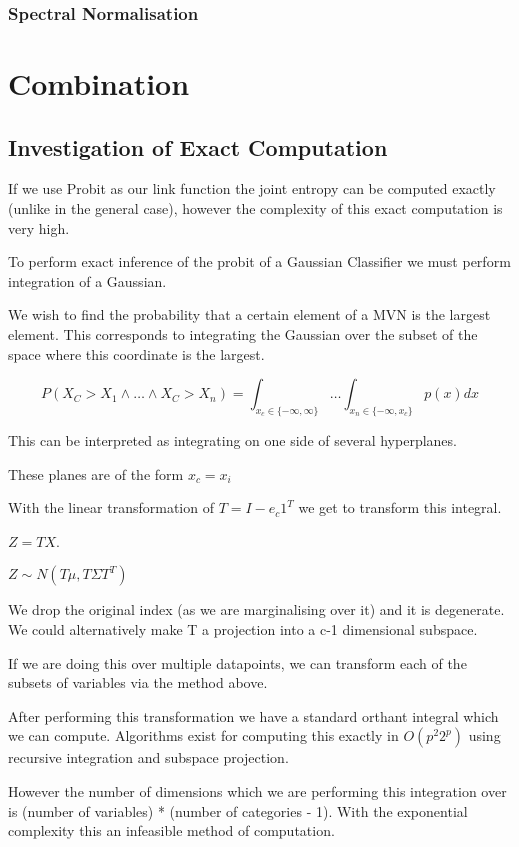 \documentclass[12pt, a4paper]{report}
\theoremstyle{definition}
\begin{document}
\subsection{Spectral Normalisation}

\chapter{Combination}
\label{Chap5}

\section{Investigation of Exact Computation}

If we use Probit as our link function the joint entropy can be computed exactly (unlike in the general case), however the complexity of this exact computation is very high.

To perform exact inference of the probit of a Gaussian Classifier we must perform integration of a Gaussian.

We wish to find the probability that a certain element of a MVN is the largest element. This corresponds to integrating the Gaussian over the subset of the space where this coordinate is the largest.

$$P(X_C > X_1 \land \ldots \land X_C > X_n) = \int_{x_c \in \{ -\infty, \infty \} } \ldots \int_{x_n \in \{ -\infty , x_c \}} p(x) dx$$

This can be interpreted as integrating on one side of several hyperplanes.

These planes are of the form $x_c = x_i$

With the linear transformation of $T = I - e_c 1^T$ we get to transform this integral.

$Z = TX$.

$Z \sim N(T \mu, T \Sigma T^T)$

We drop the original index (as we are marginalising over it) and it is degenerate. We could alternatively make T a projection into a c-1 dimensional subspace.

If we are doing this over multiple datapoints, we can transform each of the subsets of variables via the method above.

After performing this transformation we have a standard orthant integral which we can compute. Algorithms exist for computing this exactly in $O(p^2 2^p)$ using recursive integration and subspace projection. \cite{orthant}


However the number of dimensions which we are performing this integration over is (number of variables) * (number of categories - 1). With the exponential complexity this an infeasible method of computation.
\end{document}
